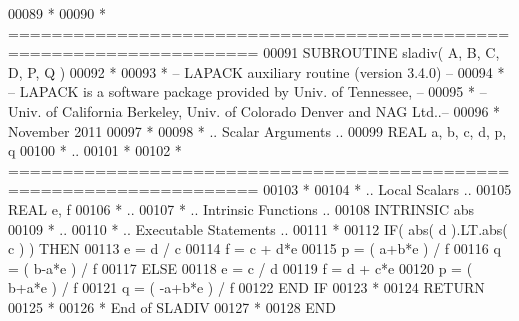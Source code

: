 \begin{DoxyCode}
00089 \textcolor{comment}{*}
00090 \textcolor{comment}{*  =====================================================================}
00091 \textcolor{keyword}{      SUBROUTINE }sladiv( A, B, C, D, P, Q )
00092 \textcolor{comment}{*}
00093 \textcolor{comment}{*  -- LAPACK auxiliary routine (version 3.4.0) --}
00094 \textcolor{comment}{*  -- LAPACK is a software package provided by Univ. of Tennessee,    --}
00095 \textcolor{comment}{*  -- Univ. of California Berkeley, Univ. of Colorado Denver and NAG Ltd..--}
00096 \textcolor{comment}{*     November 2011}
00097 \textcolor{comment}{*}
00098 \textcolor{comment}{*     .. Scalar Arguments ..}
00099       \textcolor{keywordtype}{REAL}               a, b, c, d, p, q
00100 \textcolor{comment}{*     ..}
00101 \textcolor{comment}{*}
00102 \textcolor{comment}{*  =====================================================================}
00103 \textcolor{comment}{*}
00104 \textcolor{comment}{*     .. Local Scalars ..}
00105       \textcolor{keywordtype}{REAL}               e, f
00106 \textcolor{comment}{*     ..}
00107 \textcolor{comment}{*     .. Intrinsic Functions ..}
00108       \textcolor{keywordtype}{INTRINSIC}          abs
00109 \textcolor{comment}{*     ..}
00110 \textcolor{comment}{*     .. Executable Statements ..}
00111 \textcolor{comment}{*}
00112       \textcolor{keywordflow}{IF}( abs( d ).LT.abs( c ) ) \textcolor{keywordflow}{THEN}
00113          e = d / c
00114          f = c + d*e
00115          p = ( a+b*e ) / f
00116          q = ( b-a*e ) / f
00117       \textcolor{keywordflow}{ELSE}
00118          e = c / d
00119          f = d + c*e
00120          p = ( b+a*e ) / f
00121          q = ( -a+b*e ) / f
00122 \textcolor{keywordflow}{      END IF}
00123 \textcolor{comment}{*}
00124       \textcolor{keywordflow}{RETURN}
00125 \textcolor{comment}{*}
00126 \textcolor{comment}{*     End of SLADIV}
00127 \textcolor{comment}{*}
00128 \textcolor{keyword}{      END}
\end{DoxyCode}
